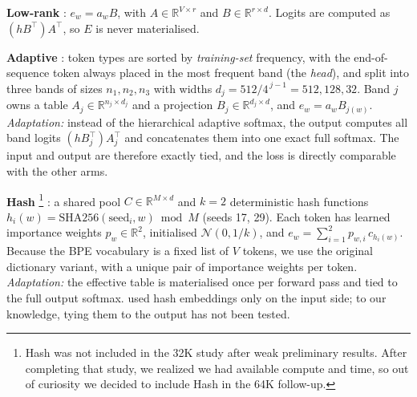 \documentclass[10pt,a4paper]{article}
\begin{document}
\textbf{Low-rank} \citep{lan2020albert}: $e_w = a_w B$, with $A\in\mathbb{R}^{V\times r}$ and
$B\in\mathbb{R}^{r\times d}$. Logits are computed as $(hB^{\top})A^{\top}$, so $E$ is never materialised.

\textbf{Adaptive} \citep{baevski2019adaptive}: token types are sorted by \emph{training-set} frequency,
with the end-of-sequence token always placed in the most frequent band (the \emph{head}), and split into three bands of sizes $n_1,n_2,n_3$ with widths
$d_j=512/4^{\,j-1}=512,128,32$. Band $j$ owns a table $A_j\in\mathbb{R}^{n_j\times d_j}$ and a
projection $B_j\in\mathbb{R}^{d_j\times d}$, and $e_w=a_{w}B_{j(w)}$. \emph{Adaptation:} instead of the
hierarchical adaptive softmax, the output computes all band logits $(hB_j^{\top})A_j^{\top}$ and
concatenates them into one exact full softmax. The input and output are therefore exactly tied, and the
loss is directly comparable with the other arms.

\textbf{Hash} \footnote{Hash was not included in the 32K study after weak preliminary results. After completing that study, we realized we had available compute and time, so out of curiosity we decided to include Hash in the 64K follow-up.}
\citep{svenstrup2017hash}: a shared pool $C\in\mathbb{R}^{M\times d}$ and $k=2$
deterministic hash functions $h_i(w)=\mathrm{SHA256}(\text{seed}_i, w) \bmod M$ (seeds 17, 29). Each token
has learned importance weights $p_w\in\mathbb{R}^{2}$, initialised $\mathcal{N}(0,1/k)$, and
$e_w = \sum_{i=1}^{2} p_{w,i}\, c_{h_i(w)}$. Because the BPE vocabulary is a
fixed list of $V$ tokens, we use the original dictionary variant, with a unique pair of importance weights per token.
\emph{Adaptation:} the effective table is materialised once per forward pass and tied to the full output softmax.
\citet{svenstrup2017hash} used hash embeddings only on the input side; to our knowledge, tying them to the
output has not been tested.
\end{document}

